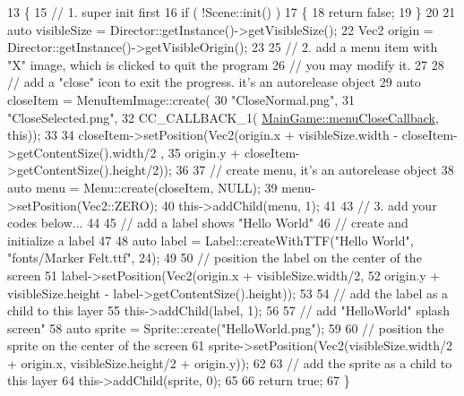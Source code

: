 \begin{DoxyCode}
13 \{
15     \textcolor{comment}{// 1. super init first}
16     \textcolor{keywordflow}{if} ( !Scene::init() )
17     \{
18         \textcolor{keywordflow}{return} \textcolor{keyword}{false};
19     \}
20     
21     \textcolor{keyword}{auto} visibleSize = Director::getInstance()->getVisibleSize();
22     Vec2 origin = Director::getInstance()->getVisibleOrigin();
23 
25     \textcolor{comment}{// 2. add a menu item with "X" image, which is clicked to quit the program}
26     \textcolor{comment}{//    you may modify it.}
27 
28     \textcolor{comment}{// add a "close" icon to exit the progress. it's an autorelease object}
29     \textcolor{keyword}{auto} closeItem = MenuItemImage::create(
30                                            \textcolor{stringliteral}{"CloseNormal.png"},
31                                            \textcolor{stringliteral}{"CloseSelected.png"},
32                                            CC\_CALLBACK\_1(
      \hyperlink{class_main_game_a824206defd2b5af2359c3699aa55e289}{MainGame::menuCloseCallback}, \textcolor{keyword}{this}));
33     
34     closeItem->setPosition(Vec2(origin.x + visibleSize.width - closeItem->getContentSize().width/2 ,
35                                 origin.y + closeItem->getContentSize().height/2));
36 
37     \textcolor{comment}{// create menu, it's an autorelease object}
38     \textcolor{keyword}{auto} menu = Menu::create(closeItem, NULL);
39     menu->setPosition(Vec2::ZERO);
40     this->addChild(menu, 1);
41 
43     \textcolor{comment}{// 3. add your codes below...}
44 
45     \textcolor{comment}{// add a label shows "Hello World"}
46     \textcolor{comment}{// create and initialize a label}
47     
48     \textcolor{keyword}{auto} label = Label::createWithTTF(\textcolor{stringliteral}{"Hello World"}, \textcolor{stringliteral}{"fonts/Marker Felt.ttf"}, 24);
49     
50     \textcolor{comment}{// position the label on the center of the screen}
51     label->setPosition(Vec2(origin.x + visibleSize.width/2,
52                             origin.y + visibleSize.height - label->getContentSize().height));
53 
54     \textcolor{comment}{// add the label as a child to this layer}
55     this->addChild(label, 1);
56 
57     \textcolor{comment}{// add "HelloWorld" splash screen"}
58     \textcolor{keyword}{auto} sprite = Sprite::create(\textcolor{stringliteral}{"HelloWorld.png"});
59 
60     \textcolor{comment}{// position the sprite on the center of the screen}
61     sprite->setPosition(Vec2(visibleSize.width/2 + origin.x, visibleSize.height/2 + origin.y));
62 
63     \textcolor{comment}{// add the sprite as a child to this layer}
64     this->addChild(sprite, 0);
65     
66     \textcolor{keywordflow}{return} \textcolor{keyword}{true};
67 \}
\end{DoxyCode}
